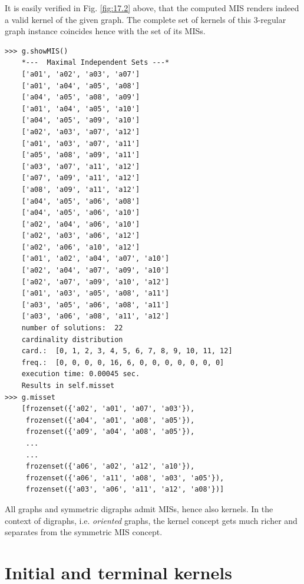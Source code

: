 It is easily verified in Fig. \ref{fig:17.2} above, that the computed MIS renders indeed a valid kernel of the given graph. The complete set of kernels of this 3-regular graph instance coincides hence with the set of its MISs. 

\begin{lstlisting}
>>> g.showMIS()
    *---  Maximal Independent Sets ---*
    ['a01', 'a02', 'a03', 'a07']
    ['a01', 'a04', 'a05', 'a08']
    ['a04', 'a05', 'a08', 'a09']
    ['a01', 'a04', 'a05', 'a10']
    ['a04', 'a05', 'a09', 'a10']
    ['a02', 'a03', 'a07', 'a12']
    ['a01', 'a03', 'a07', 'a11']
    ['a05', 'a08', 'a09', 'a11']
    ['a03', 'a07', 'a11', 'a12']
    ['a07', 'a09', 'a11', 'a12']
    ['a08', 'a09', 'a11', 'a12']
    ['a04', 'a05', 'a06', 'a08']
    ['a04', 'a05', 'a06', 'a10']
    ['a02', 'a04', 'a06', 'a10']
    ['a02', 'a03', 'a06', 'a12']
    ['a02', 'a06', 'a10', 'a12']
    ['a01', 'a02', 'a04', 'a07', 'a10']
    ['a02', 'a04', 'a07', 'a09', 'a10']
    ['a02', 'a07', 'a09', 'a10', 'a12']
    ['a01', 'a03', 'a05', 'a08', 'a11']
    ['a03', 'a05', 'a06', 'a08', 'a11']
    ['a03', 'a06', 'a08', 'a11', 'a12']
    number of solutions:  22
    cardinality distribution
    card.:  [0, 1, 2, 3, 4, 5, 6, 7, 8, 9, 10, 11, 12]
    freq.:  [0, 0, 0, 0, 16, 6, 0, 0, 0, 0, 0, 0, 0]
    execution time: 0.00045 sec.
    Results in self.misset
>>> g.misset
    [frozenset({'a02', 'a01', 'a07', 'a03'}),
     frozenset({'a04', 'a01', 'a08', 'a05'}),
     frozenset({'a09', 'a04', 'a08', 'a05'}),
     ...
     ...
     frozenset({'a06', 'a02', 'a12', 'a10'}),
     frozenset({'a06', 'a11', 'a08', 'a03', 'a05'}),
     frozenset({'a03', 'a06', 'a11', 'a12', 'a08'})]
\end{lstlisting}

All graphs and symmetric digraphs admit MISs, hence also kernels. In the context of digraphs, i.e. \emph{oriented} graphs, the kernel concept gets much richer and separates from the symmetric MIS concept.  

\section{Initial and terminal kernels}
\label{sec:17.2}

